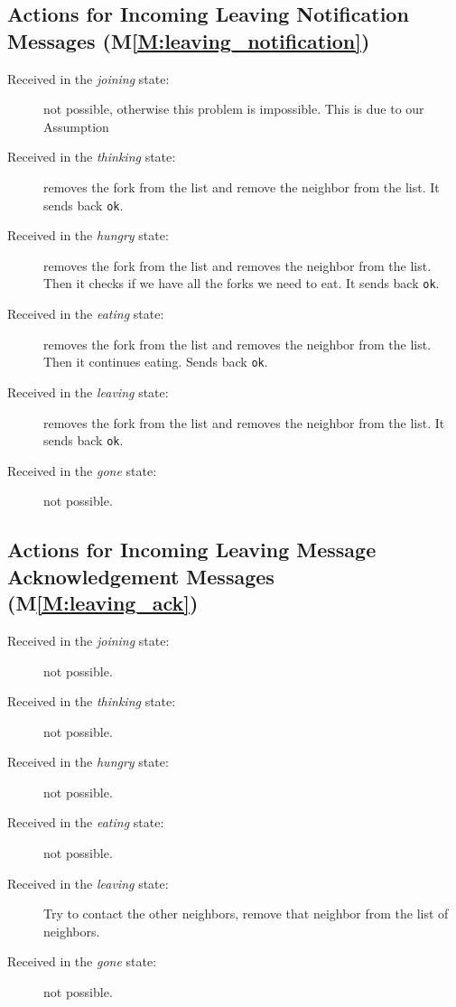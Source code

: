 \documentclass[11pt]{article}
\begin{document}
\subsection{Actions for Incoming Leaving Notification Messages (M\ref{M:leaving_notification})}
\begin{description}
\item[Received in the \textit{joining} state:] not possible, otherwise this problem is impossible. This is due to our Assumption
\item[Received in the \textit{thinking} state:] removes the fork from the list and remove the neighbor from the list. It sends back \texttt{ok}.
\item[Received in the \textit{hungry} state:] removes the fork from the list and removes the neighbor from the list. Then it checks if we have all the forks we need to eat. It sends back \texttt{ok}.
\item[Received in the \textit{eating} state:] removes the fork from the list and removes the neighbor from the list. Then it continues eating. Sends back \texttt{ok}.
\item[Received in the \textit{leaving} state:] removes the fork from the list and removes the neighbor from the list. It sends back \texttt{ok}.
\item[Received in the \textit{gone} state:] not possible.
\end{description}

\subsection{Actions for Incoming Leaving Message Acknowledgement Messages (M\ref{M:leaving_ack})}
\begin{description}
\item[Received in the \textit{joining} state:] not possible.
\item[Received in the \textit{thinking} state:] not possible.
\item[Received in the \textit{hungry} state:] not possible.
\item[Received in the \textit{eating} state:] not possible.
\item[Received in the \textit{leaving} state:] Try to contact the other neighbors, remove that neighbor from the list of neighbors.
\item[Received in the \textit{gone} state:] not possible.
\end{description}
\end{document}
